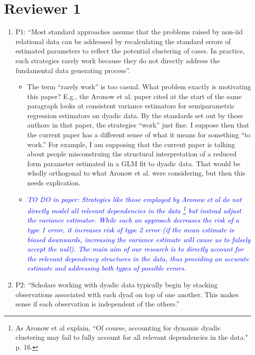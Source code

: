 \section*{Reviewer 1}

\begin{enumerate}
	\item P1: ``Most standard approaches assume that the problems raised by non-iid relational data can be addressed by recalculating the standard errors of estimated parameters to reflect the potential clustering of cases. In practice, such strategies rarely work because they do not directly address the fundamental data generating process''.
	\begin{itemize}
		\item The term “rarely work” is too casual.  What problem exactly is motivating this paper?  E.g., the Aronow et al. paper cited at the start of the same paragraph looks at consistent variance estimators for semiparametric regression estimators on dyadic data. By the standards set out by those authors in that paper, the strategies “work” just fine.  I suppose then that the current paper has a different sense of what it means for something “to work.” For example, I am supposing that the current paper is talking about people misconstruing the structural interpretation of a reduced form parameter estimated in a GLM fit to dyadic data.  That would be wholly orthogonal to what Aronow et al. were considering, but then this needs explication.
	\end{itemize}
	\begin{itemize}
		\item \textcolor{blue}{ \emph{
		TO DO in paper: Strategies like those employed by Aronow et al do not directly model all relevant dependencies in the data \footnote{As Aronow et al explain, “Of course, accounting for dynamic dyadic clustering may fail to fully account for all relevant dependencies in the data." p. 16.} but instead adjust the variance estimator.  While such an approach decreases the risk of a type 1 error, it increases risk of type 2 error (if the mean estimate is biased downwards, increasing the variance estimate will cause us to falsely accept the null). The main aim of our research is to directly account for the relevant dependency structures in the data, thus providing an accurate estimate and addressing both types of possible errors.
		}}
	\end{itemize}
	\item P2: “Scholars working with dyadic data typically begin by stacking observations associated with each dyad on top of one another. This makes sense if each observation is independent of the others.”

\end{enumerate}
